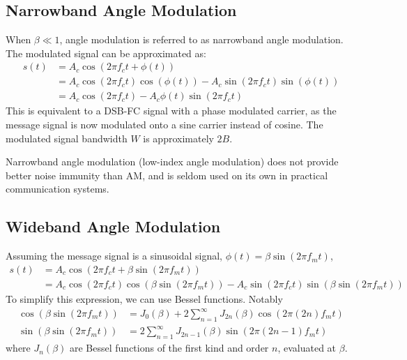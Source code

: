 \documentclass{article}
\begin{document}
\subsection{Narrowband Angle Modulation}
When \(\beta \ll 1\), angle modulation is referred to as narrowband
angle modulation. The modulated signal can be approximated as:
\begin{align*}
    s\left( t \right) & = A_c \cos{\left( 2 \pi f_c t + \phi\left( t \right) \right)}                                                                                                     \\
                      & = A_c \cos{\left( 2 \pi f_c t \right)} \cos{\left( \phi\left( t \right) \right)} - A_c \sin{\left( 2 \pi f_c t \right)} \sin{\left( \phi\left( t \right) \right)} \\
                      & = A_c \cos{\left( 2 \pi f_c t \right)} - A_c \phi\left( t \right) \sin{\left( 2 \pi f_c t \right)}
\end{align*}
This is equivalent to a DSB-FC signal with a phase modulated carrier, as
the message signal is now modulated onto a sine carrier instead of
cosine. The modulated signal bandwidth \(W\) is approximately \(2B\).

Narrowband angle modulation (low-index angle modulation) does not
provide better noise immunity than AM, and is seldom used on its own in
practical communication systems.
\subsection{Wideband Angle Modulation}
Assuming the message signal is a sinusoidal signal, \(\phi\left( t
\right) = \beta \sin{\left( 2 \pi f_m t \right)}\),
\begin{align*}
    s\left( t \right) & = A_c \cos{\left( 2 \pi f_c t + \beta \sin{\left( 2 \pi f_m t \right)} \right)}                                                                                                                       \\
                      & = A_c \cos{\left( 2 \pi f_c t \right)} \cos{\left( \beta \sin{\left( 2 \pi f_m t \right)} \right)} - A_c \sin{\left( 2 \pi f_c t \right)} \sin{\left( \beta \sin{\left( 2 \pi f_m t \right)} \right)}
\end{align*}
To simplify this expression, we can use Bessel functions. Notably
\begin{align*}
    \cos{\left( \beta \sin{\left( 2 \pi f_m t \right)} \right)} & = J_0\left( \beta \right) + 2 \sum_{n=1}^{\infty} J_{2n}\left( \beta \right) \cos{\left( 2 \pi \left( 2n \right) f_m t \right)} \\
    \sin{\left( \beta \sin{\left( 2 \pi f_m t \right)} \right)} & = 2 \sum_{n=1}^{\infty} J_{2n-1}\left( \beta \right) \sin{\left( 2 \pi \left( 2n-1 \right) f_m t \right)}
\end{align*}
where \(J_n\left( \beta \right)\) are Bessel functions of the first kind
and order \(n\), evaluated at \(\beta\).
\end{document}
